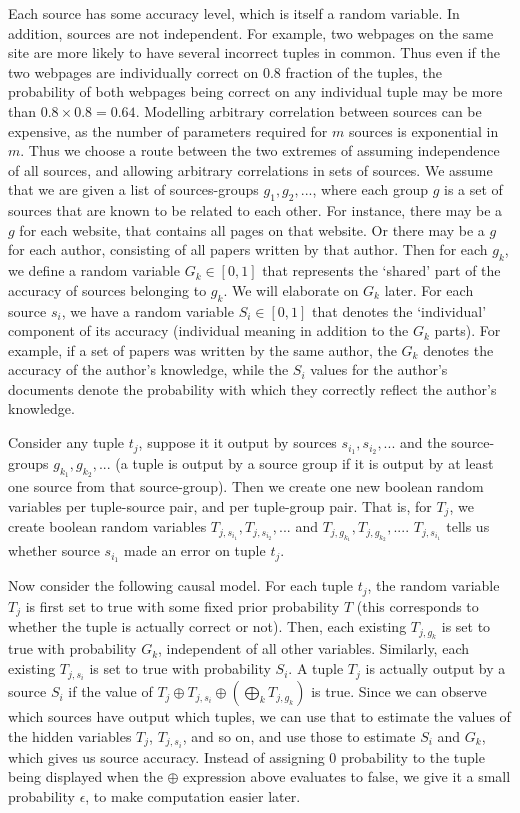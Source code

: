 \documentclass{sig-alternate}
\newcounter{prob}
\begin{document}
Each source has some accuracy level, which is itself a random variable. In addition, sources are not independent. For example, two webpages on the same site are more likely to have several incorrect tuples in common. Thus even if the two webpages are individually correct on $0.8$ fraction of the tuples, the probability of both webpages being correct on any individual tuple may be more than $0.8 \times 0.8 = 0.64$. Modelling arbitrary  correlation between sources can be expensive, as the number of parameters required for $m$ sources is exponential in $m$. Thus we choose a route between the two extremes of assuming independence of all sources, and allowing arbitrary correlations in sets of sources. We assume that we are given a list of sources-groups $g_1, g_2, ...$, where each group $g$ is a set of sources that are known to be related to each other. For instance, there may be a $g$ for each website, that contains all pages on that website. Or there may be a $g$ for each author, consisting of all papers written by that author. Then for each $g_k$, we define a random variable $G_k \in [0,1]$ that represents the `shared' part of the accuracy of sources belonging to $g_k$. We will elaborate on $G_k$ later. For each source $s_i$, we have a random variable $S_i \in [0,1]$ that denotes the `individual' component of its accuracy (individual meaning in addition to the $G_k$ parts). For example, if a set of papers was written by the same author, the $G_k$ denotes the accuracy of the author's knowledge, while the $S_i$ values for the author's documents denote the probability with which they correctly reflect the author's knowledge.

Consider any tuple $t_j$, suppose it it output by sources $s_{i_1}, s_{i_2}, ... $ and the source-groups $g_{k_1}, g_{k_2}, ...$ (a tuple is output by a source group if it is output by at least one source from that source-group). Then we create one new boolean random variables per tuple-source pair, and per tuple-group pair. That is, for $T_j$, we create boolean random variables $T_{j, s_{i_1}}, T_{j, s_{i_2}}, ...$ and $T_{j,g_{k_1}}, T_{j, g_{k_2}}, ...$. $T_{j, s_{i_1}}$ tells us whether source $s_{i_1}$ made an error on tuple $t_j$. 

Now consider the following causal model. For each tuple $t_j$, the random variable $T_j$ is first set to true with some fixed prior probability $T$ (this corresponds to whether the tuple is actually correct or not). Then, each existing $T_{j, g_k}$ is set to true with probability $G_k$, independent of all other variables. Similarly, each existing $T_{j, s_i}$ is set to true with probability $S_i$. A tuple $T_j$ is actually output by a source $S_i$ if the value of $T_j \oplus T_{j, s_i} \oplus(\bigoplus_{k} T_{j, g_k})$ is true. Since we can observe which sources have output which tuples, we can use that to estimate the values of the hidden variables $T_j$, $T_{j, s_i}$, and so on, and use those to estimate $S_i$ and $G_k$, which gives us source accuracy. Instead of assigning $0$ probability to the tuple being displayed when the $\oplus$ expression above evaluates to false, we give it a small probability $\epsilon$, to make computation easier later.
\end{document}
